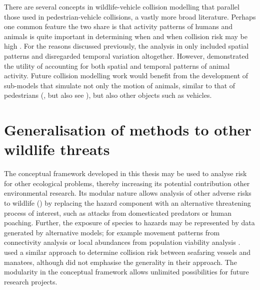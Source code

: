 There are several concepts in wildlife-vehicle collision modelling that parallel those used in pedestrian-vehicle collisions, a vastly more broad literature. Perhaps one common feature the two share is that activity patterns of humans and animals is quite important in determining when and when collision risk may be high \citep{}. For the reasons discussed previously, the analysis in  only included spatial patterns and disregarded temporal variation altogether. However,  demonstrated the utility of accounting for both spatial and temporal patterns of animal activity. Future collision modelling work would benefit from the development of sub-models that simulate not only the motion of animals, similar to that of pedestrians (\cite{lohn10}, but also see \cite{}), but also other objects such as vehicles.

\section{Generalisation of methods to other wildlife threats}

The conceptual framework developed in this thesis may be used to analyse risk for other ecological problems, thereby increasing its potential contribution other environmental research. Its modular nature allows analysis of other adverse risks to wildlife () by replacing the hazard component with an alternative threatening process of interest, such as attacks from domesticated predators or human poaching. Further, the exposure of species to hazards may be represented by data generated by alternative models; for example movement patterns from connectivity analysis \citep{} or local abundances from population viability analysis \citep{}. \cite{baud13} used a similar approach to determine collision risk between seafaring vessels and manatees, although did not emphasise the generality in their approach. The modularity in the conceptual framework allows unlimited possibilities for future research projects.

